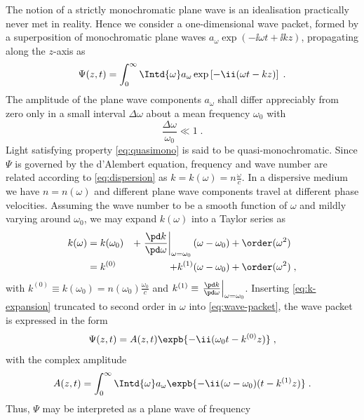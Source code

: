 \documentclass[
twoside,
openright,
titlepage,
numbers=noenddot,
headinclude,
fleqn,
a4paper,
footinclude=true,
cleardoublepage=empty,
abstractoff,
BCOR=5mm,
paper=a4,
fontsize=11pt,
british,ngerman,american,
]{scrreprt}
\begin{document}
The notion of a strictly monochromatic plane wave is an idealisation
practically never met in reality.  Hence we consider a one-dimensional
wave packet, formed by a superposition of monochromatic plane waves
$a_\omega\exp(-\ii\omega t+\ii k z)$, propagating along the $z$-axis
as
\begin{equation}
  \label{eq:wave-packet}
  \Psi(z,t) = \int_0^\infty\Intd{\omega}a_\omega\exp\left[-\ii(\omega t-k z)\right]\;.
\end{equation}
The amplitude of the plane wave components $a_\omega$ shall differ
appreciably from zero only in a small interval $\Delta\omega$ about
a mean frequency $\omega_0$ with
\begin{equation}
  \label{eq:quasimono}
  \frac{\Delta\omega}{\omega_0}\ll 1 \;.  
\end{equation}
Light satisfying property \cref{eq:quasimono} is said to be
quasi-monochromatic.  Since $\Psi$ is governed by the d'Alembert
equation, frequency and wave number are related according to
\cref{eq:dispersion} as $k=k(\omega)=n\frac{\omega}{c}$.  In a
dispersive medium we have $n=n(\omega)$ and different plane wave
components travel at different phase velocities.  Assuming the wave
number to be a smooth function of $\omega$ and mildly varying around
$\omega_0$, we may expand $k(\omega)$ into a Taylor series as
\begin{equation}
\label{eq:k-expansion}
  \begin{split}
    k(\omega) 
    & = k(\omega_0) 
 &+\left.\frac{\pd k}{\pd\omega}\right|_{\omega=\omega_0}(\omega-\omega_0)
    &+\order(\omega^2)
    \\   & = k^{(0)} &+k^{(1)}(\omega-\omega_0)&+\order(\omega^2) \;,
  \end{split}
\end{equation}
with $k^{(0)} \equiv k(\omega_0) = n(\omega_0)\frac{\omega_0}{c}$ and
$k^{(1)} \equiv \left.\frac{\pd
    k}{\pd\omega}\right|_{\omega=\omega_0}$. Inserting
\cref{eq:k-expansion} truncated to second order in $\omega$ into
\cref{eq:wave-packet}, the wave packet is expressed in the form
\begin{equation}
  \Psi(z,t) = A(z,t)\expb{-\ii(\omega_0t -k^{(0)} z)} \;,
\end{equation}
with the complex amplitude
\begin{equation}
  \label{eq:complex-amplitude}
   A(z,t)= 
   \int_0^\infty\Intd{\omega}a_\omega
   \expb{-\ii(\omega-\omega_0)(t-k^{(1)}z)}\;.
\end{equation}
Thus, $\Psi$ may be interpreted as a plane wave of frequency
\end{document}
